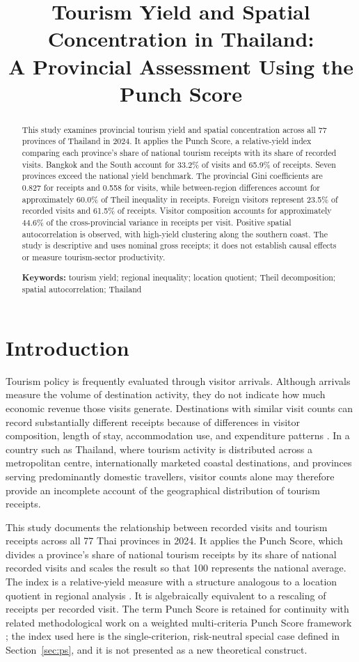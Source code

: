 \documentclass[11pt,a4paper]{article}
\title{Tourism Yield and Spatial Concentration in Thailand:\\ A Provincial Assessment Using the Punch Score}
\date{}
\begin{document}
\maketitle

\begin{abstract}
\noindent This study examines provincial tourism yield and spatial concentration across all 77 provinces of Thailand in 2024. It applies the Punch Score, a relative-yield index comparing each province's share of national tourism receipts with its share of recorded visits. Bangkok and the South account for 33.2\% of visits and 65.9\% of receipts. Seven provinces exceed the national yield benchmark. The provincial Gini coefficients are 0.827 for receipts and 0.558 for visits, while between-region differences account for approximately 60.0\% of Theil inequality in receipts. Foreign visitors represent 23.5\% of recorded visits and 61.5\% of receipts. Visitor composition accounts for approximately 44.6\% of the cross-provincial variance in receipts per visit. Positive spatial autocorrelation is observed, with high-yield clustering along the southern coast. The study is descriptive and uses nominal gross receipts; it does not establish causal effects or measure tourism-sector productivity.

\medskip\noindent\textbf{Keywords:} tourism yield; regional inequality; location quotient; Theil decomposition; spatial autocorrelation; Thailand
\end{abstract}

\section{Introduction}
Tourism policy is frequently evaluated through visitor arrivals. Although arrivals measure the volume of destination activity, they do not indicate how much economic revenue those visits generate. Destinations with similar visit counts can record substantially different receipts because of differences in visitor composition, length of stay, accommodation use, and expenditure patterns \citep{wang2010,brida2013}. In a country such as Thailand, where tourism activity is distributed across a metropolitan centre, internationally marketed coastal destinations, and provinces serving predominantly domestic travellers, visitor counts alone may therefore provide an incomplete account of the geographical distribution of tourism receipts.

This study documents the relationship between recorded visits and tourism receipts across all 77 Thai provinces in 2024. It applies the Punch Score, which divides a province's share of national tourism receipts by its share of national recorded visits and scales the result so that 100 represents the national average. The index is a relative-yield measure with a structure analogous to a location quotient in regional analysis \citep{isard1960}. It is algebraically equivalent to a rescaling of receipts per recorded visit. The term Punch Score is retained for continuity with related methodological work on a weighted multi-criteria Punch Score framework \citep{anon2026b,anon2026}; the index used here is the single-criterion, risk-neutral special case defined in Section~\ref{sec:ps}, and it is not presented as a new theoretical construct.
\end{document}
